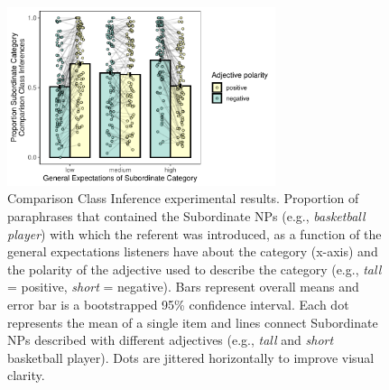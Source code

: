 \documentclass[doc, floatsintext]{apa6}
\begin{document}



\begin{figure}[t]
\centering
\includegraphics[width=0.7\textwidth]{figs/bars_cc_finalExpt_prereg_bars_syncDodge.pdf}
\caption{Comparison Class Inference experimental results. Proportion of paraphrases that contained the Subordinate NPs (e.g., \emph{basketball player}) with which the referent was introduced, as a function of the general expectations listeners have about the category (x-axis) and the polarity of the adjective used to describe the category (e.g., \emph{tall} = positive, \emph{short} = negative). Bars represent overall means and error bar is a bootstrapped 95\% confidence interval. Each dot represents the mean of a single item and lines connect Subordinate NPs described with different adjectives (e.g., \emph{tall} and \emph{short} basketball player). Dots are jittered horizontally to improve visual clarity.}\label{fig:ccInferenceMain}
\end{figure}
\end{document}

